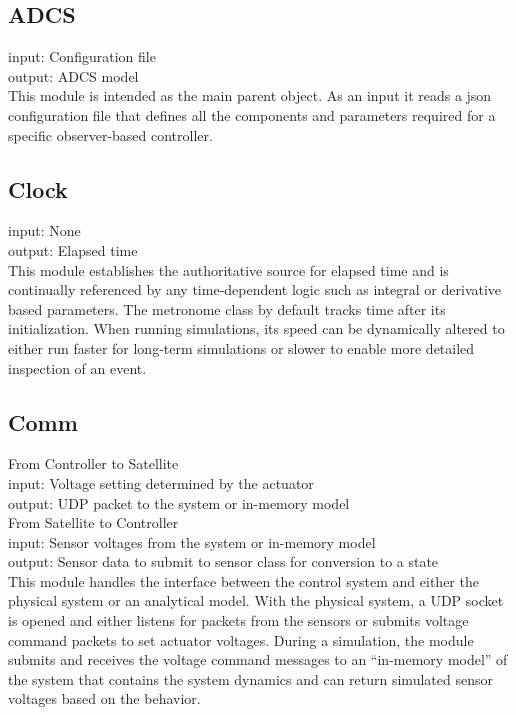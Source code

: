 \subsection{ADCS}
\label{subsec:ADCS}

input: Configuration file\\
output: ADCS model\\

This module is intended as the main parent object.  As an input it reads a json configuration file that defines all the components and parameters required for a specific observer-based controller.


\subsection{Clock}
\label{subsec:Clock}

input: None\\
output: Elapsed time\\

This module establishes the authoritative source for elapsed time and is continually referenced by any time-dependent logic such as integral or derivative based parameters. The metronome class by default tracks time after its initialization.  When running simulations, its speed can be dynamically altered to either run faster for long-term simulations or slower to enable more detailed inspection of an event.


\subsection{Comm}
\label{subsec:Comm}

From Controller to Satellite\\
input: Voltage setting determined by the actuator\\
output: UDP packet to the system or in-memory model\\
From Satellite to Controller\\
input: Sensor voltages from the system or in-memory model\\
output: Sensor data to submit to sensor class for conversion to a state\\

This module handles the interface between the control system and either the physical system or an analytical model. With the physical system, a UDP socket is opened and either listens for packets from the sensors or submits voltage command packets to set actuator voltages. During a simulation, the module submits and receives the voltage command messages to an ``in-memory model'' of the system that contains the system dynamics and can return simulated sensor voltages based on the behavior.


